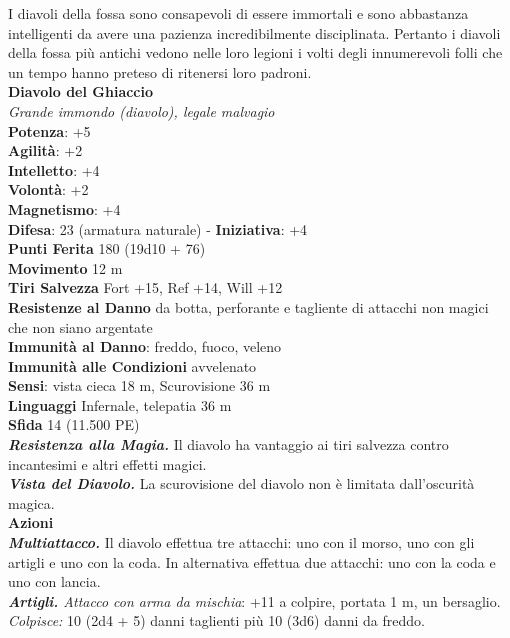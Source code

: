 \begin{multicols}{2}
I diavoli della fossa sono consapevoli di essere immortali e sono abbastanza intelligenti da avere una pazienza incredibilmente disciplinata. Pertanto i diavoli della fossa più antichi vedono nelle loro legioni i volti degli innumerevoli folli che un tempo hanno preteso di ritenersi loro padroni.\\

\medskip\textbf{Diavolo del Ghiaccio}\\
\emph{Grande immondo (diavolo), legale malvagio}\\
\textbf{Potenza}: +5\\
\textbf{Agilità}: +2\\
\textbf{Intelletto}: +4\\
\textbf{Volontà}: +2\\
\textbf{Magnetismo}: +4\\
\textbf{Difesa}: 23 (armatura naturale) - \textbf{Iniziativa}: +4\\
\textbf{Punti Ferita} 180 (19d10 + 76)\\
\textbf{Movimento} 12 m\\
\textbf{Tiri Salvezza} Fort +15, Ref +14, Will +12\\
\textbf{Resistenze al Danno} da botta, perforante e tagliente di attacchi non magici che non siano argentate\\
\textbf{Immunità al Danno}: freddo, fuoco, veleno\\
\textbf{Immunità alle Condizioni} avvelenato\\
\textbf{Sensi}: vista cieca 18 m, Scurovisione 36 m\\
\textbf{Linguaggi} Infernale, telepatia 36 m \\
\textbf{Sfida} 14 (11.500 PE)\smallskip\\
\emph{\textbf{Resistenza alla Magia.}} Il diavolo ha vantaggio ai tiri salvezza contro incantesimi e altri effetti magici.\\
\emph{\textbf{Vista del Diavolo.}} La scurovisione del diavolo non è limitata dall'oscurità magica.\\
\smallskip\textbf{Azioni}\\
\emph{\textbf{Multiattacco.}} Il diavolo effettua tre attacchi: uno con
il morso, uno con gli artigli e uno con la coda. In alternativa effettua due attacchi: uno con la coda e uno con lancia.\\
\emph{\textbf{Artigli.} Attacco con arma da mischia}: +11 a colpire, portata 1 m, un bersaglio.\\
\emph{Colpisce:} 10 (2d4 + 5) danni taglienti più 10 (3d6) danni da freddo.\\

\end{multicols}
